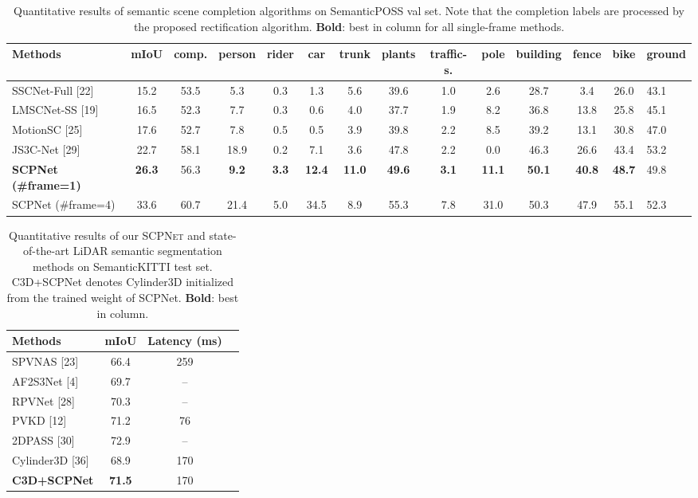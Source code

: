 \documentclass[10pt,twocolumn,letterpaper]{article}
\newcommand{\methodname}{\textsc{SCPNet}}
\begin{document}
\begin{table}[htbp]
\centering
\caption{Quantitative results of semantic scene completion algorithms on SemanticPOSS val set. Note that the completion labels are processed by the proposed rectification algorithm. \textbf{Bold}: best in column for all single-frame methods.}
\label{tab:semanticposs}
\small
\begin{tabular}{lcccccccccccc}
\toprule
Methods & mIoU & comp. & person & rider & car & trunk & plants & traffic-s. & pole & building & fence & bike & ground \\
\midrule
SSCNet-Full [22]  & 15.2 & 53.5 & 5.3 & 0.3 & 1.3 & 5.6 & 39.6 & 1.0 & 2.6 & 28.7 & 3.4 & 26.0 & 43.1 \\
LMSCNet-SS [19]   & 16.5 & 52.3 & 7.7 & 0.3 & 0.6 & 4.0 & 37.7 & 1.9 & 8.2 & 36.8 & 13.8 & 25.8 & 45.1 \\
MotionSC [25]     & 17.6 & 52.7 & 7.8 & 0.5 & 0.5 & 3.9 & 39.8 & 2.2 & 8.5 & 39.2 & 13.1 & 30.8 & 47.0 \\
JS3C-Net [29]     & 22.7 & 58.1 & 18.9 & 0.2 & 7.1 & 3.6 & 47.8 & 2.2 & 0.0 & 46.3 & 26.6 & 43.4 & 53.2 \\
\midrule
\textbf{SCPNet (\#frame=1)} & \textbf{26.3} & 56.3 & \textbf{9.2} & \textbf{3.3} & \textbf{12.4} & \textbf{11.0} & \textbf{49.6} & \textbf{3.1} & \textbf{11.1} & \textbf{50.1} & \textbf{40.8} & \textbf{48.7} & 49.8 \\
SCPNet (\#frame=4) & 33.6 & 60.7 & 21.4 & 5.0 & 34.5 & 8.9 & 55.3 & 7.8 & 31.0 & 50.3 & 47.9 & 55.1 & 52.3 \\
\bottomrule
\end{tabular}
\end{table}

\begin{table}[htbp]
\centering
\caption{Quantitative results of our \methodname{} and state-of-the-art LiDAR semantic segmentation methods on SemanticKITTI test set. C3D+SCPNet denotes Cylinder3D initialized from the trained weight of SCPNet. \textbf{Bold}: best in column.}
\label{tab:segmentation}
\small
\begin{tabular}{lccc}
\toprule
Methods & mIoU & Latency (ms) \\
\midrule
SPVNAS [23]      & 66.4 & 259 \\
AF2S3Net [4]     & 69.7 & -- \\
RPVNet [28]      & 70.3 & -- \\
PVKD [12]        & 71.2 & 76 \\
2DPASS [30]      & 72.9 & -- \\
Cylinder3D [36]  & 68.9 & 170 \\
\midrule
\textbf{C3D+SCPNet} & \textbf{71.5} & 170 \\
\bottomrule
\end{tabular}
\end{table}
\end{document}
